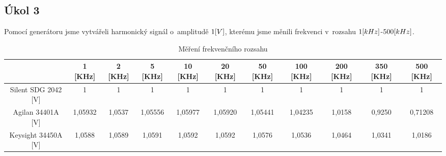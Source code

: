 \documentclass{article}
\begin{document}
\subsection*{Úkol 3}
Pomocí generátoru jsme vytvářeli harmonický signál o~amplitudě \(1\-[V]\), kterému jsme měnili frekvenci v~rozsahu \(1\-[kHz]\)-\(500\-[kHz]\).\\ 
\begin{table}[H]
    \footnotesize
    \vspace{-6mm}
    \hspace{-8mm}
    \begin{tabular}{|c|c|c|c|c|c|c|c|c|c|c|}
    \hline
                        & 1 [KHz]  	& 2 [KHz]	& 5 [KHz]	& 10 [KHz]	& 20 [KHz]	& 50 [KHz]	& 100 [KHz]	& 200 [KHz]	& 350 [KHz]	& 500 [KHz] \\ \hline
    Silent SDG 2042 [V]	& 1	        & 1	        & 1      	& 1   	    & 1   	    & 1   	    & 1   	    & 1	        & 1   	    & 1         \\ \hline
    Agilan 34401A   [V]	& 1,05932	& 1,0537	& 1,05556	& 1,05977	& 1,05920	& 1,05441	& 1,04235	& 1,0158	& 0,9250	& 0,71208   \\ \hline
    Keysight 34450A [V]	& 1,0588	& 1,0589	& 1,0591	& 1,0592	& 1,0592	& 1,0576	& 1,0536	& 1,0464	& 1,0341	& 1,0186    \\ \hline
    \end{tabular}
    \caption{\label{frekvencni_rozsah} Měření frekvenčního rozsahu}
    \normalsize
\end{table}
\end{document}
